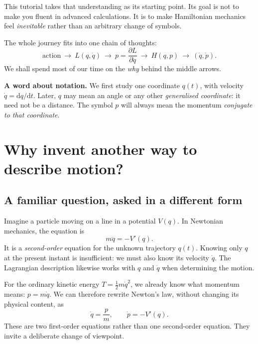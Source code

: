 \documentclass[11pt,a4paper,oneside]{article}
\newcommand{\pd}[2]{\frac{\partial #1}{\partial #2}}
\begin{document}
This tutorial takes that understanding as its starting point. Its goal is not to make you fluent in advanced calculations. It is to make Hamiltonian mechanics feel \emph{inevitable} rather than an arbitrary change of symbols.

\begin{intuition}
The whole journey fits into one chain of thoughts:
\[
\boxed{\text{action}\ \longrightarrow\ L(q,\dot q)\ \longrightarrow\ p=\pd{L}{\dot q}\ \longrightarrow\ H(q,p)\ \longrightarrow\ (\dot q,\dot p).}
\]
We shall spend most of our time on the \emph{why} behind the middle arrows.
\end{intuition}

\textbf{A word about notation.} We first study one coordinate $q(t)$, with velocity $\dot q=\mathrm dq/\mathrm dt$. Later, $q$ may mean an angle or any other \emph{generalised coordinate}: it need not be a distance. The symbol $p$ will always mean the momentum \emph{conjugate to that coordinate}.

\clearpage
\setcounter{tocdepth}{1}
\tableofcontents
\clearpage

\section{Why invent another way to describe motion?}
\subsection{A familiar question, asked in a different form}
Imagine a particle moving on a line in a potential $V(q)$. In Newtonian mechanics, the equation is
\[
 m\ddot q=-V'(q).
\]
It is a \emph{second-order} equation for the unknown trajectory $q(t)$. Knowing only $q$ at the present instant is insufficient: we must also know its velocity $\dot q$. The Lagrangian description likewise works with $q$ and $\dot q$ when determining the motion.

For the ordinary kinetic energy $T=\tfrac12m\dot q^2$, we already know what momentum means: $p=m\dot q$. We can therefore rewrite Newton's law, without changing its physical content, as
\begin{equation}\label{eq:newtonpair}
 \boxed{\dot q=\frac{p}{m},\qquad \dot p=-V'(q).}
\end{equation}
These are two first-order equations rather than one second-order equation. They invite a deliberate change of viewpoint.
\end{document}

